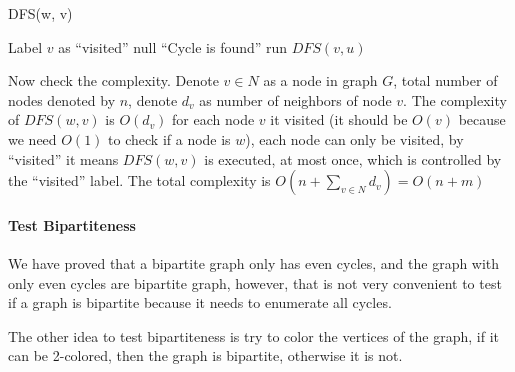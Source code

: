                 \begin{algorithm}[H]
                    \caption{DFS(w, v)}
                    \begin{algorithmic}[1]
                        \State Label $v$ as ``visited''
                            \State \Return null
                        \Else
                                    \State \Return ``Cycle is found'' 
                                \Else
                                    \State run $DFS(v, u)$
                                \EndIf
                            \EndFor
                        \EndIf
                    \end{algorithmic}
                \end{algorithm}

                Now check the complexity. Denote $v\in N$ as a node in graph $G$, total number of nodes denoted by $n$, denote $d_v$ as number of neighbors of node $v$. The complexity of $DFS(w, v)$ is $O(d_v)$ for each node $v$ it visited (it should be $O(v)$ because we need $O(1)$ to check if a node is $w$), each node can only be visited, by ``visited'' it means $DFS(w, v)$ is executed, at most once, which is controlled by the ``visited'' label. The total complexity is $O(n + \sum_{v\in N} d_v) = O(n + m)$

            \paragraph{Test Bipartiteness}
                We have proved that a bipartite graph only has even cycles, and the graph with only even cycles are bipartite graph, however, that is not very convenient to test if a graph is bipartite because it needs to enumerate all cycles.

                The other idea to test bipartiteness is try to color the vertices of the graph, if it can be 2-colored, then the graph is bipartite, otherwise it is not.

